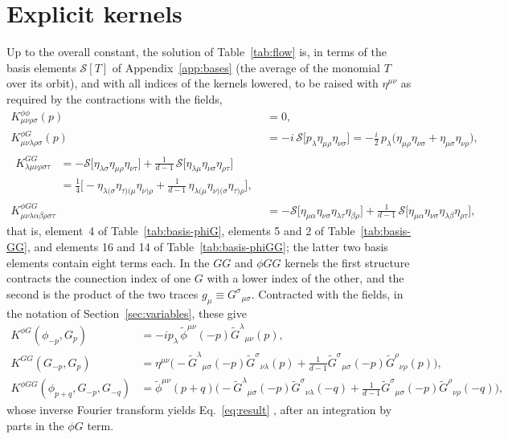 \documentclass[prd,aps,preprint,superscriptaddress,nofootinbib,amsmath,amssymb,eqsecnum]{revtex4-2}
\newcommand{\p}{\tilde{\phi}}
\newcommand{\G}{\tilde{G}}
\providecommand{\DIFdeltex}[1]{{\protect\color{red} \scriptsize #1}} %
\providecommand{\DIFdelbegin}{} %
\providecommand{\DIFdelend}{} %
\providecommand{\DIFdel}[1]{\texorpdfstring{\DIFdeltex{#1}}{}} %
\begin{document}
\section{Explicit kernels}
\label{app:kernels}

Up to the overall constant, the solution of Table~\ref{tab:flow} is, in terms of the basis
elements $\mathcal{S}[T]$ of Appendix~\ref{app:bases} (the average of the monomial $T$ over
its orbit), and with all indices of the kernels lowered, to be raised with $\eta^{\mu\nu}$
as required by the contractions with the fields,
\begin{align}
K^{\phi\phi}_{\mu\nu\rho\sigma}(p)&=0,\\
K^{\phi G}_{\mu\nu\lambda\rho\sigma}(p)&=-i\,\mathcal{S}\big[p_\lambda\eta_{\mu\rho}\eta_{\nu\sigma}\big]
=-\tfrac{i}{2}\,p_\lambda\big(\eta_{\mu\rho}\eta_{\nu\sigma}+\eta_{\mu\sigma}\eta_{\nu\rho}\big),\\
\begin{split}
K^{GG}_{\lambda\mu\nu\rho\sigma\tau}&=
-\mathcal{S}\big[\eta_{\lambda\sigma}\eta_{\mu\rho}\eta_{\nu\tau}\big]
+\frac{1}{d-1}\,\mathcal{S}\big[\eta_{\lambda\mu}\eta_{\nu\sigma}\eta_{\rho\tau}\big]\\
&=\tfrac14\Big[-\eta_{\lambda(\sigma}\eta_{\tau)(\mu}\eta_{\nu)\rho}
+\frac{1}{d-1}\,\eta_{\lambda(\mu}\eta_{\nu)(\sigma}\eta_{\tau)\rho}\Big],
\end{split}\\
K^{\phi GG}_{\mu\nu\lambda\alpha\beta\rho\sigma\tau}&=
-\mathcal{S}\big[\eta_{\mu\alpha}\eta_{\nu\sigma}\eta_{\lambda\tau}\eta_{\beta\rho}\big]
+\frac{1}{d-1}\,\mathcal{S}\big[\eta_{\mu\alpha}\eta_{\nu\sigma}\eta_{\lambda\beta}\eta_{\rho\tau}\big],
\end{align}
that is, element~4 of Table~\ref{tab:basis-phiG}, elements 5 and 2 of
Table~\ref{tab:basis-GG}, and elements 16 and 14 of Table~\ref{tab:basis-phiGG}; the latter
two basis elements contain eight terms each. In the $GG$ and $\phi GG$ kernels the first
structure contracts the connection index of one $G$ with a lower index of the other, and the
second is the product of the two traces $g_\mu\equiv G^{\sigma}{}_{\mu\sigma}$.
Contracted with the fields, in the notation of Section~\ref{sec:variables}, these give
\begin{align}
K^{\phi G}(\phi_{-p},G_p)&=-ip_\lambda\,\p^{\mu\nu}(-p)\G^{\lambda}{}_{\mu\nu}(p),\\
K^{GG}(G_{-p},G_p)&=
\eta^{\mu\nu}\Big(-\G^{\lambda}{}_{\mu\sigma}(-p)\G^{\sigma}{}_{\nu\lambda}(p)+\frac{1}{d-1}\G^{\sigma}{}_{\mu\sigma}(-p)\G^{\rho}{}_{\nu\rho}(p)\Big),\\
K^{\phi GG}(\phi_{p+q},G_{-p},G_{-q})&=
\p^{\mu\nu}(p+q)\Big(-\G^{\lambda}{}_{\mu\sigma}(-p)\G^{\sigma}{}_{\nu\lambda}(-q)+\frac{1}{d-1}\G^{\sigma}{}_{\mu\sigma}(-p)\G^{\rho}{}_{\nu\rho}(-q)\Big),
\end{align}
whose inverse Fourier transform yields Eq.~\eqref{eq:result}\DIFdelbegin \DIFdel{, after an integration by parts
in the $\phi G$ term}\DIFdelend .
\end{document}
